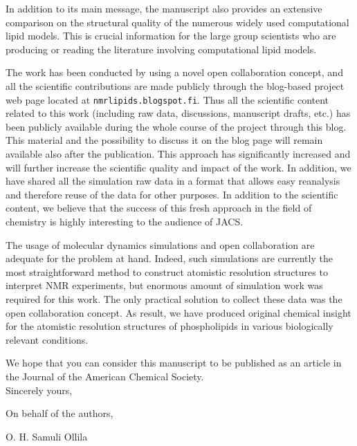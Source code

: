 \documentclass[11pt]{letter}
\begin{document}
In addition to its main message, the manuscript also provides an extensive comparison on the structural quality 
of the numerous widely used computational lipid models. This is crucial information 
for the large group scientists who are producing or reading the literature involving computational lipid models.

The work has been conducted by using a novel open collaboration concept, and all the scientific contributions
are made publicly through the blog-based project web page located at \texttt{nmrlipids.blogspot.fi}. 
Thus all the scientific content related to this work (including raw data, discussions, manuscript drafts, etc.)
has been publicly available during the whole course of the project through this blog. This material and the possibility to 
discuss it on the blog page will remain available also after the publication. This approach has significantly 
increased and will further increase the scientific quality and impact of the work. In addition, we have shared 
all the simulation raw data in a format that allows easy reanalysis and therefore reuse of the data for other purposes. 
In addition to the scientific content, we believe that the success of this fresh approach in the field of chemistry 
is highly interesting to the audience of JACS.

The usage of molecular dynamics simulations and open collaboration are adequate for the
problem at hand. Indeed, such simulations are currently the most straightforward method to 
construct atomistic resolution structures to interpret NMR experiments, but
enormous amount of simulation work was required for this work. The only practical
solution to collect these data was the open collaboration concept.
As result, we have produced original chemical insight for the atomistic resolution 
structures of phospholipids in various biologically relevant conditions.

We hope that you can consider this manuscript to be published as an article in the Journal of the American Chemical Society. \\

Sincerely yours,

On behalf of the authors,

O. H. Samuli Ollila
\end{document}
